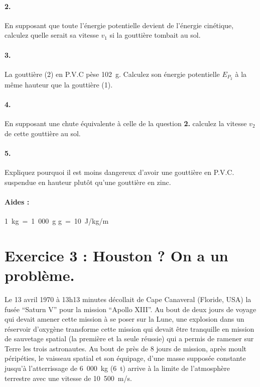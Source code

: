 \documentclass[12pt,a4paper]{article}
\begin{document}
\paragraph{2.} En supposant que toute l'énergie potentielle devient de l'énergie cinétique, calculez quelle serait sa vitesse $v_1$ si la gouttière tombait au sol.

\paragraph{3.} La gouttière (2) en P.V.C pèse 102~g. Calculez son énergie potentielle $E_{P_2}$ à la même hauteur que la gouttière (1).

\paragraph{4.} En supposant une chute équivalente à celle de la question \textbf{2.} calculez la vitesse $v_2$ de cette gouttière au sol.

\paragraph{5.} Expliquez pourquoi il est moins dangereux d'avoir une gouttière en P.V.C. suspendue en hauteur plutôt qu'une gouttière en zinc.

\paragraph{Aides :} \hfill 1~kg~=~1~000~g \hfill g~=~10~J/kg/m \hfill ~

\section*{Exercice 3 : Houston ? On a un problème.}
Le 13 avril 1970 à 13h13 minutes décollait de Cape Canaveral (Floride, USA) la fusée ``Saturn V'' pour la mission ``Apollo XIII''. Au bout de deux jours de voyage qui devait amener cette mission à se poser sur la Lune, une explosion dans un réservoir d'oxygène transforme cette mission qui devait être tranquille en mission de sauvetage spatial (la première et la seule réussie) qui a permis de ramener sur Terre les trois astronautes.
Au bout de près de 8 jours de mission, après moult péripéties, le vaisseau spatial et son équipage, d'une masse supposée constante jusqu'à l'atterrissage de 6~000~kg (6~t) arrive à la limite de l'atmosphère terrestre avec une vitesse de 10~500~m/s.
\end{document}
